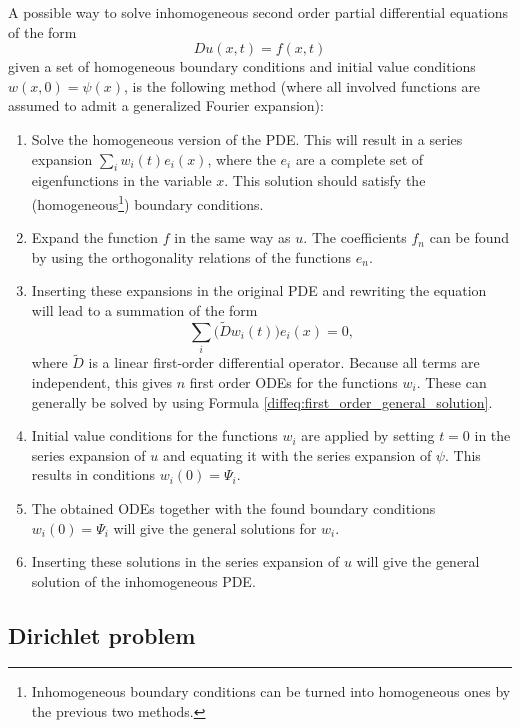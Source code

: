     \begin{method}
        A possible way to solve inhomogeneous second order partial differential equations of the form \[Du(x,t) = f(x,t)\] given a set of homogeneous boundary conditions and initial value conditions $w(x,0) = \psi(x)$, is the following method (where all involved functions are assumed to admit a generalized Fourier expansion):
        \begin{enumerate}
            \item Solve the homogeneous version of the PDE. This will result in a series expansion $\sum_iw_i(t)e_i(x)$, where the $e_i$ are a complete set of eigenfunctions in the variable $x$. This solution should satisfy the (homogeneous\footnote{Inhomogeneous boundary conditions can be turned into homogeneous ones by the previous two methods.}) boundary conditions.
            \item Expand the function $f$ in the same way as $u$. The coefficients $f_n$ can be found by using the orthogonality relations of the functions $e_n$.
            \item Inserting these expansions in the original PDE and rewriting the equation will lead to a summation of the form
            \[\sum_i\big(\widetilde{D}w_i(t)\big)e_i(x) = 0,\] where $\widetilde{D}$ is a linear first-order differential operator. Because all terms are independent, this gives $n$ first order ODEs for the functions $w_i$. These can generally be solved by using Formula \ref{diffeq:first_order_general_solution}.
            \item Initial value conditions for the functions $w_i$ are applied by setting $t=0$ in the series expansion of $u$ and equating it with the series expansion of $\psi$. This results in conditions $w_i(0) = \Psi_i$.
            \item The obtained ODEs together with the found boundary conditions $w_i(0) = \Psi_i$ will give the general solutions for $w_i$.
            \item Inserting these solutions in the series expansion of $u$ will give the general solution of the inhomogeneous PDE.
        \end{enumerate}
    \end{method}

\subsection{Dirichlet problem}

